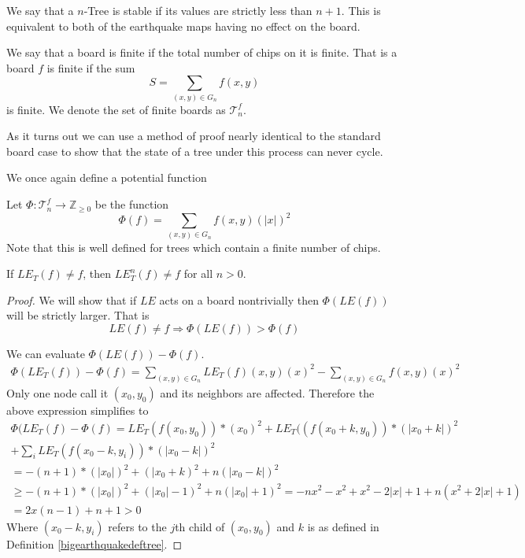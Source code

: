 \documentclass[runningheads,a4paper]{llncs}
\begin{document}
\begin{definition}
We say that a $n$-Tree is stable if its values are strictly less than $n+1$. This is equivalent to both of the earthquake maps having no effect on the board. 
\end{definition}

\begin{definition} 
We say that a board is finite if the total number of chips on it is finite. That is a board $f$ is finite if the sum
\begin{equation}
S= \sum_{(x,y) \in G_n} f(x,y) 
\end{equation}
is finite. 
We denote the set of finite boards as $\mathcal{T}_n^f$.
\end{definition}

As it turns out we can use a  method of proof nearly identical to the standard board case to show that the state of a tree under this process can never cycle.

We once again define a potential function 
\begin{definition} Let $\Phi: \mathcal{T}_n^f \rightarrow \mathbb{Z}_{\geq 0}$ be the  function
\begin{equation}
\Phi(f) = \sum_{(x,y) \in G_n} f(x,y)(|x|)^2
\end{equation}
Note that this is well defined for trees which contain a finite number of chips. 
\end{definition} 

\begin{lemma}
If $LE_T(f) \neq f$, then $LE_T^n(f) \neq f$ for all $n > 0$.
\end{lemma}

\begin{proof}
We will show that  if $LE$ acts on a board nontrivially then $\Phi(LE(f))$ will be strictly larger. That is  
\begin{equation}
LE(f) \neq f \Rightarrow \Phi(LE(f)) > \Phi(f)
\end{equation}


We can evaluate $\Phi(LE(f)) - \Phi(f)$.
\begin{align}
\Phi(LE_T(f))-\Phi(f) = \sum_{(x,y) \in G_n} LE_T(f)(x,y)(x)^2 - \sum_{(x,y) \in G_n} f(x,y)(x)^2 
\end{align}
Only one node call it $(x_0,y_0)$ and its neighbors are affected. Therefore the above expression simplifies to
\begin{align*}
\Phi(LE_T(f)-\Phi(f) = LE_T( f(x_0,y_0) )* (x_0)^2 + LE_T( (f(x_0+k, y_0) )* (|x_0+k|)^2 \\
+ \sum_{i} LE_T( f(x_0-k, y_i) ) * (|x_0-k|)^2 \\
= -(n+1)*(|x_0|)^2 + (|x_0+k)^2 + n (|x_0-k|)^2 \\
\geq-(n+1)*(|x_0|)^2 + (|x_0|-1)^2 + n (|x_0|+1)^2
= -nx^2-x^2+x^2-2|x|+1+n(x^2+2|x|+1) \\
= 2x(n-1)+n+1 > 0
\end{align*}
Where $(x_0-k,y_i)$ refers to the $j$th child of $(x_0,y_0)$ and $k$ is as defined in Definition \ref{bigearthquakedeftree}.
\end{proof}
\end{document}
